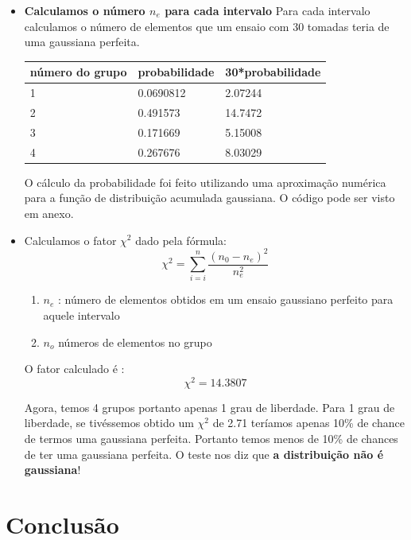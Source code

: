 \documentclass[a4paper,11pt]{article}
\begin{document}
\begin{itemize}
\FloatBarrier
	\item \textbf{Calculamos o número $n_e$ para cada intervalo} 
	Para cada intervalo calculamos o número de elementos que um ensaio com 30 tomadas teria de uma gaussiana
	perfeita.
	\FloatBarrier
	\begin{table}[!htp]
	\centering
	\begin{tabular}{|l|l|l|} \hline
	número do grupo & probabilidade & 30*probabilidade \\ \hline
1	 & 0.0690812 & 2.07244  \\ \hline
2	 &0.491573 & 14.7472\\ \hline
3	 &0.171669 & 5.15008\\ \hline
4	 &0.267676 &8.03029 \\ \hline
	\end{tabular}
	\end{table}
	 \FloatBarrier
	 
	 O cálculo da probabilidade foi feito utilizando uma aproximação numérica para a função de distribuição acumulada
	 gaussiana. O código pode ser visto em anexo.

\item Calculamos o fator $\chi^2$
dado pela fórmula:
	\begin{equation}
		\chi^2 = \sum _{i = i}^n \frac{(n_0 - n_e)^2}{n_e^2}
	\end{equation}

\begin{enumerate}
	\item	$n_e$ : número de elementos obtidos em um ensaio gaussiano perfeito para aquele intervalo
	\item $n_o$ números de elementos no grupo
\end{enumerate}

O fator calculado é :
\begin{equation}
	\chi^2 = 14.3807
\end{equation}

Agora, temos 4 grupos portanto apenas 1 grau de liberdade. Para 1 grau de liberdade, se tivéssemos obtido um
$\chi^2$ de 2.71 teríamos apenas 10\% de chance de termos uma gaussiana perfeita. Portanto temos menos de 10\%
de chances de ter uma gaussiana perfeita. O teste nos diz que \textbf{a distribuição não é gaussiana}!

\end{itemize}
\newpage

\section{Conclusão}
\end{document}
